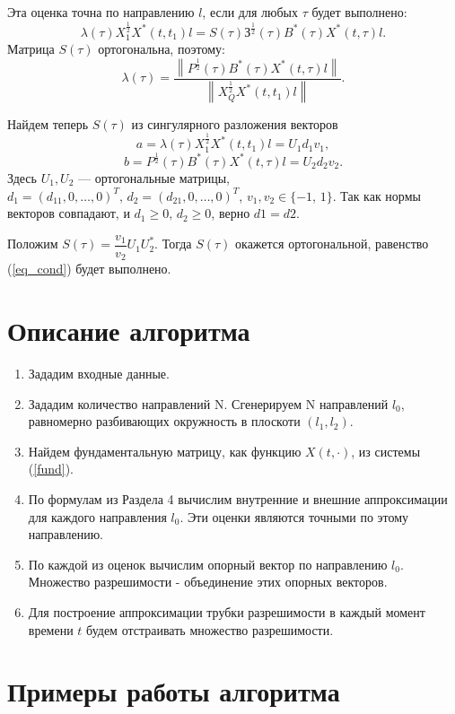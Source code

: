 \documentclass[16pt]{article}
\newcommand\Norm[1]{\left\| #1 \right\|}
\begin{document}
Эта оценка точна по направлению $l$, если для любых $\tau$ будет выполнено:
\begin{equation}\label{eq_cond}
\lambda(\tau)X_1^\frac12X^*(t, t_1)l = S(\tau)З^{\frac12}(\tau)B^*(\tau)X^*(t, \tau)l.
\end{equation}
Матрица $S(\tau)$ ортогональна, поэтому: 
$$\lambda(\tau) = \dfrac{\Norm{P^{\frac12}(\tau)B^*(\tau)X^*(t, \tau)l}}{\Norm{X_Q^\frac12X^*(t, t_1)l}}.$$

Найдем теперь $S(\tau)$ из сингулярного разложения векторов
$$a = \lambda(\tau)X_1^\frac12X^*(t, t_1)l = U_1d_1v_1,$$
$$b = P^{\frac12}(\tau)B^*(\tau)X^*(t, \tau)l = U_2d_2v_2.$$
Здесь $U_1, U_2$ --- ортогональные матрицы, $d_1 = (d_{11}, 0, \ldots, 0)^T,\, d_2 = (d_{21}, 0, \ldots, 0)^T$,
$v_1, v_2 \in \{-1,\, 1\}$. Так как нормы векторов совпадают, и $d_1 \geq 0, \, d_2 \geq 0$, верно $d1 = d2$.

Положим $S(\tau) = \dfrac{v_1}{v_2}U_1U_2^*$. Тогда $S(\tau)$ окажется ортогональной, равенство (\ref{eq_cond}) будет выполнено.

\section{Описание алгоритма}
\begin{enumerate}
    \item Зададим входные данные.
    \item Зададим количество направлений N. Сгенерируем N направлений $l_0$, равномерно разбивающих окружность в плоскоти $(l_1, l_2)$.
    \item Найдем фундаментальную матрицу, как функцию $X(t, \cdot)$, из системы (\ref{fund}).
    \item По формулам из Раздела 4 вычислим внутренние и внешние аппроксимации для каждого направления $l_0$. Эти оценки являются точными по этому направлению.
    \item По каждой из оценок вычислим опорный вектор по направлению $l_0$. Множество разрешимости - объединение этих опорных векторов.
    \item Для построение аппроксимации трубки разрешимости в каждый момент времени $t$ будем отстраивать множество разрешимости.
\end{enumerate}

\section{Примеры работы алгоритма}
\end{document}

